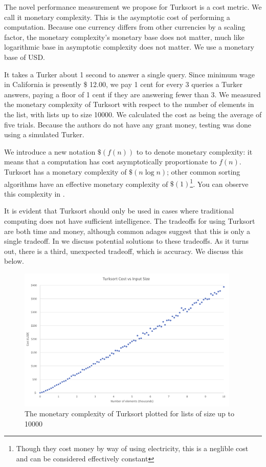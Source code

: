 \documentclass{article}
\begin{document}
The novel performance measurement we propose for Turksort is a cost metric. We
call it monetary complexity. This is the asymptotic cost of performing a
computation. Because one currency differs from other currencies by a scaling
factor, the monetary complexity's monetary base does not matter, much like
logarithmic base in asymptotic complexity does not matter. We use a monetary
base of USD.

It takes a Turker about 1 second to answer a single query. Since minimum wage in
California is presently \$ 12.00, we pay 1 cent for every 3 queries a Turker
answers, paying a floor of 1 cent if they are answering fewer than 3. We
measured the monetary complexity of Turksort with respect to the number of
elements in the list, with lists up to size 10000. We calculated the cost as
being the average of five trials. Because the authors do not have any grant
money, testing was done using a simulated Turker.

We introduce a new notation \(\$(f(n))\) to to denote monetary complexity: it
means that a computation has cost asymptotically proportionate to \(f(n)\).
Turksort has a monetary complexity of \(\$(n \log n)\); other common sorting
algorithms have an effective monetary complexity of \(\$(1)\)\footnote{Though
  they cost money by way of using electricity, this is a neglible cost and can
  be considered effectively constant}. You can observe this complexity in
.

It is evident that Turksort should only be used in cases where traditional
computing does not have sufficient intelligence. The tradeoffs for using
Turksort are both time and money, although common adages suggest that this is
only a single tradeoff. In  we discuss potential solutions
to these tradeoffs. As it turns out, there is a third, unexpected tradeoff,
which is accuracy. We discuss this below.

\begin{figure}
  \centering
  \includegraphics[width=300pt]{costs.png}
  \caption{The monetary complexity of Turksort plotted for lists of size up to
    10000}
  \label{fig:costs}
\end{figure}
\end{document}
